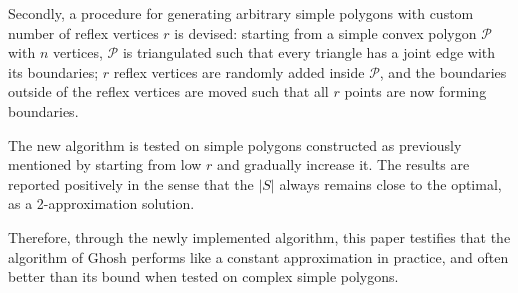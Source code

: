 Secondly, a procedure for generating arbitrary simple polygons with custom number of reflex vertices $r$ is devised: starting from a simple convex polygon $\mathcal P$ with $n$ vertices, $\mathcal P$ is triangulated such that every triangle has a joint edge with its boundaries; $r$ reflex vertices are randomly added inside $\mathcal P$, and the boundaries outside of the reflex vertices are moved such that all $r$ points are now forming boundaries.

The new algorithm is tested on simple polygons constructed as previously mentioned by starting from low $r$ and gradually increase it. The results are reported positively in the sense that the $|S|$ always remains close to the optimal, as a 2-approximation solution.

Therefore, through the newly implemented algorithm, this paper \cite{maleki2022implementation} testifies that the algorithm of Ghosh \cite{GHOSH2010718} performs like a constant approximation in practice, and often better than its bound when tested on complex simple polygons.

